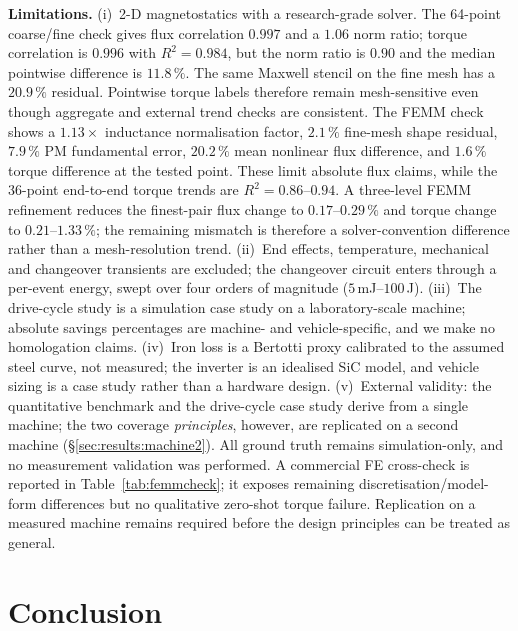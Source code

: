 \documentclass[review]{elsarticle}
\begin{document}
\textbf{Limitations.} (i)~2-D magnetostatics with a research-grade solver.
The 64-point coarse/fine check gives flux correlation $0.997$ and a
$1.06$ norm ratio; torque correlation is $0.996$ with $R^2=0.984$, but the
norm ratio is $0.90$ and the median pointwise difference is $11.8\,\%$.
The same Maxwell stencil on the fine mesh has a $20.9\,\%$ residual.
Pointwise torque labels therefore remain mesh-sensitive even
though aggregate and external trend checks are consistent. The FEMM check
shows a $1.13\times$ inductance normalisation factor, $2.1\,\%$
fine-mesh shape residual, $7.9\,\%$ PM fundamental error, $20.2\,\%$ mean
nonlinear flux difference, and $1.6\,\%$ torque difference at the tested
point. These limit absolute flux claims, while the 36-point end-to-end
torque trends are $R^2=0.86$--$0.94$. A three-level FEMM refinement
reduces the finest-pair flux change to $0.17$--$0.29\,\%$ and torque
change to $0.21$--$1.33\,\%$; the remaining mismatch is therefore a
solver-convention difference rather than a mesh-resolution trend.
(ii)~End effects, temperature, mechanical and changeover
transients are excluded; the changeover circuit enters through a per-event
energy, swept over four orders of magnitude ($5$\,mJ--$100$\,J).
(iii)~The drive-cycle study is a
simulation case study on a laboratory-scale machine; absolute savings
percentages are machine- and vehicle-specific, and we make no homologation
claims. (iv)~Iron loss is a Bertotti proxy calibrated to the assumed steel
curve, not measured; the inverter is an idealised SiC model, and vehicle
sizing is a case study rather than a hardware design. (v)~External validity: the quantitative benchmark
and the drive-cycle case study derive from a single machine; the two
coverage \emph{principles}, however, are replicated on a second machine
(\S\ref{sec:results:machine2}). All ground truth remains simulation-only,
and no measurement validation was performed. A commercial FE cross-check is
reported in Table~\ref{tab:femmcheck}; it exposes remaining
discretisation/model-form differences but no qualitative zero-shot torque
failure. Replication on a measured machine remains required
before the design principles can be treated as general.

\section{Conclusion}
\label{sec:conclusion}
\end{document}

